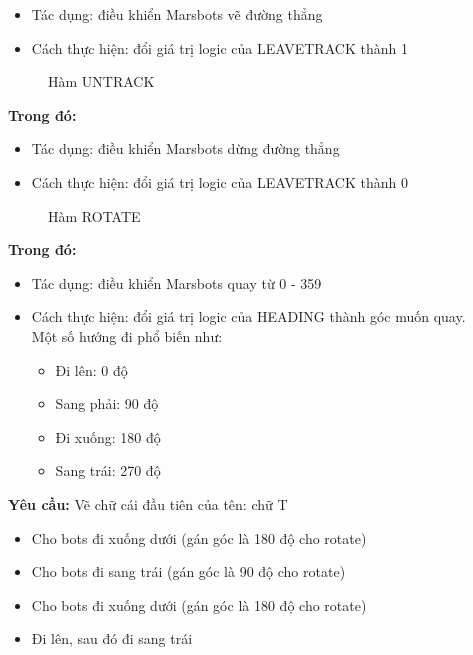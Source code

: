 \documentclass[a4paper,12pt]{article}
\begin{document}
\begin{itemize}
	\item Tác dụng: điều khiển Marsbots vẽ đường thẳng
	\item Cách thực hiện: đổi giá trị logic của LEAVETRACK thành 1
\end{itemize}
\FloatBarrier
\begin{figure}[ht!]
	\centerline{}
	\caption{Hàm UNTRACK}
	\label{fig:ass1}
\end{figure}
\noindent
\textbf{Trong đó: }
\begin{itemize}
	\item Tác dụng: điều khiển Marsbots dừng đường thẳng
	\item Cách thực hiện: đổi giá trị logic của LEAVETRACK thành 0
\end{itemize}
\newpage
\FloatBarrier
\begin{figure}[ht!]
	\centerline{}
	\caption{Hàm ROTATE}
	\label{fig:ass1}
\end{figure}
\noindent
\textbf{Trong đó: }
\begin{itemize}
	\item Tác dụng: điều khiển Marsbots quay từ 0 - 359
	\item Cách thực hiện: đổi giá trị logic của HEADING  thành góc muốn quay. \\ Một số hướng đi phổ biến như:
	\begin{itemize}
		\item Đi lên: 0 độ
		\item Sang phải: 90 độ
		\item Đi xuống: 180 độ
		\item Sang trái: 270 độ
	\end{itemize}
\end{itemize}
\textbf{Yêu cầu: }Vẽ chữ cái đầu tiên của tên: chữ T
\begin{itemize}
	\item Cho bots đi xuống dưới (gán góc là 180 độ cho rotate)
	\item Cho bots đi sang trái (gán góc là 90 độ cho rotate)
	\item Cho bots đi xuống dưới (gán góc là 180 độ cho rotate)
	\item Đi lên, sau đó đi sang trái
\end{itemize}
\end{document}
